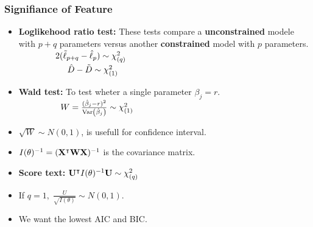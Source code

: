 \documentclass[10pt, french]{article}
\begin{document}
\begin{multicols*}{3}
\subsubsection*{Signifiance of Feature}
\begin{itemize}[align=left,leftmargin=*]
  \item \textbf{Loglikehood ratio test:} These tests compare a \textbf{unconstrained} modele with $p+q$ parameters versus another \textbf{constrained }model with $p$ parameters. \\
  $\hspace*{1.5cm} 2(\tilde{\ell}_{p+q} - \hat{\ell}_p) \sim \chi_{(q)}^2$\\
  $\hspace*{2cm} \hat{D} - \tilde{D} \sim \chi_{(1)}^2$
  \item \textbf{Wald test:} To test wheter a single parameter $\beta_j=r$. \\
  $\hspace*{1.7cm} W = \frac{(\hat{\beta}_j - r)^2}{\mathrm{Var} {\left( \hat{\beta}_j \right)}} \sim \chi_{(1)}^2$
  \item[] $\sqrt{W} \sim N(0,1)$, is usefull for confidence interval.
  \item[] $I(\theta)^{-1} = (\mathbf{X}^\intercal\mathbf{W}\mathbf{X})^{-1}$ is the covariance matrix.
  \item \textbf{Score text:} $ \mathbf{U}^\intercal I(\theta)^{-1}\mathbf{U}\sim \chi_{(q)}^2$
  \item[] If $q=1,\; \frac{U}{\sqrt{I(\theta)}}\sim N(0,1).$
  \item We want the lowest AIC and BIC.
\end{itemize}


\end{multicols*}
\end{document}
